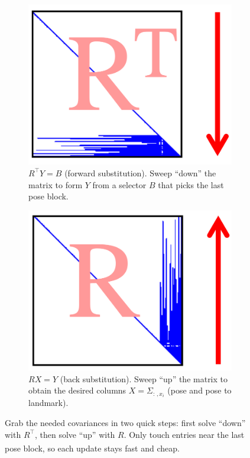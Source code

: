 \begin{figure}[H]
  \centering
  \begin{subfigure}[t]{0.49\linewidth}
    \centering
    \includegraphics[width=\linewidth]{Pictures/Optimizers/iSAM/Substitution_Forward.png}
    \caption{$R^\top Y = B$ (forward substitution). Sweep ``down'' the matrix to form $Y$ from a selector $B$ that picks the last pose block.}
    \label{fig:left}
  \end{subfigure}\hfill
  \begin{subfigure}[t]{0.49\linewidth}
    \centering
    \includegraphics[width=\linewidth]{Pictures/Optimizers/iSAM/Substitution_Downwards.png}
    \caption{$R X = Y$ (back substitution). Sweep ``up'' the matrix to obtain the desired columns $X=\Sigma_{:\,,x_i}$ (pose and pose to landmark).}
    \label{fig:right}
  \end{subfigure}
  \caption{Grab the needed covariances in two quick steps: first solve ``down'' with $R^\top$, then solve ``up'' with $R$. Only touch entries near the last pose block, so each update stays fast and cheap.\textsuperscript{\cite{iSAM_paper}}}
  \label{fig:substitution-foward-backwards}
\end{figure}
